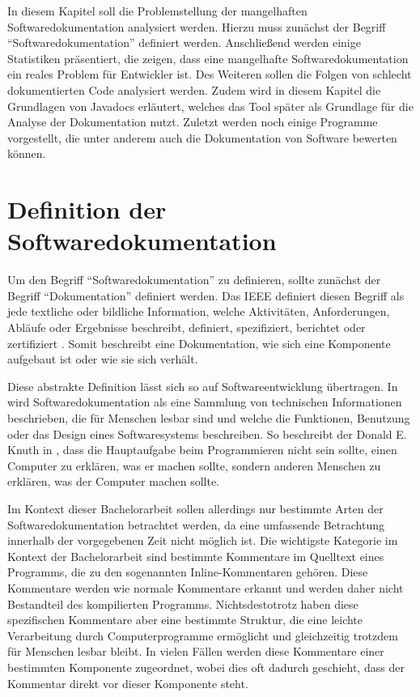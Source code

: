 \label{sec:background}
In diesem Kapitel soll die Problemstellung der mangelhaften Softwaredokumentation analysiert werden. Hierzu muss zunächst der Begriff \enquote{Softwaredokumentation} definiert werden. Anschließend werden einige Statistiken präsentiert, die zeigen, dass eine mangelhafte Softwaredokumentation ein reales Problem für Entwickler ist. Des Weiteren sollen die Folgen von schlecht dokumentierten Code analysiert werden. Zudem wird in diesem Kapitel die Grundlagen von Javadocs erläutert, welches das Tool später als Grundlage für die Analyse der Dokumentation nutzt. Zuletzt werden noch einige Programme vorgestellt, die unter anderem auch die Dokumentation von Software bewerten können. 

\section{Definition der Softwaredokumentation}
Um den Begriff \enquote{Softwaredokumentation} zu definieren, sollte zunächst der Begriff \enquote{Dokumentation} definiert werden. Das IEEE  definiert diesen Begriff als jede textliche oder bildliche Information, welche Aktivitäten, Anforderungen, Abläufe oder Ergebnisse beschreibt, definiert, spezifiziert, berichtet oder zertifiziert \cite[S. 28]{IEEEStandardGlossaryofSoftwareEngineeringTerminology}. Somit beschreibt eine Dokumentation, wie sich eine Komponente aufgebaut ist oder wie sie sich verhält.

Diese abstrakte Definition lässt sich so auf Softwareentwicklung übertragen. In \cite[S. 125]{Softwaredocumentationandstandards} wird Softwaredokumentation als eine Sammlung von technischen Informationen beschrieben, die für Menschen lesbar sind und welche die Funktionen, Benutzung oder das Design eines Softwaresystems beschreiben. So beschreibt der Donald E. Knuth in \cite[S. 97]{LiterateProgramming}, dass die Hauptaufgabe beim Programmieren nicht sein sollte, einen Computer zu erklären, was er machen sollte, sondern anderen Menschen zu erklären, was der Computer machen sollte.

Im Kontext dieser Bachelorarbeit sollen allerdings nur bestimmte Arten der Softwaredokumentation betrachtet werden, da eine umfassende Betrachtung innerhalb der vorgegebenen Zeit nicht möglich ist. Die wichtigste Kategorie im Kontext der Bachelorarbeit sind bestimmte Kommentare im Quelltext eines Programms, die zu den sogenannten Inline-Kommentaren gehören. Diese Kommentare werden wie normale Kommentare erkannt und werden daher nicht Bestandteil des kompilierten Programms. Nichtsdestotrotz haben diese spezifischen Kommentare aber eine bestimmte Struktur, die eine leichte Verarbeitung durch Computerprogramme ermöglicht und gleichzeitig trotzdem für Menschen lesbar bleibt. In vielen Fällen werden diese Kommentare einer bestimmten Komponente zugeordnet, wobei dies oft dadurch geschieht, dass der Kommentar direkt vor dieser Komponente steht.

